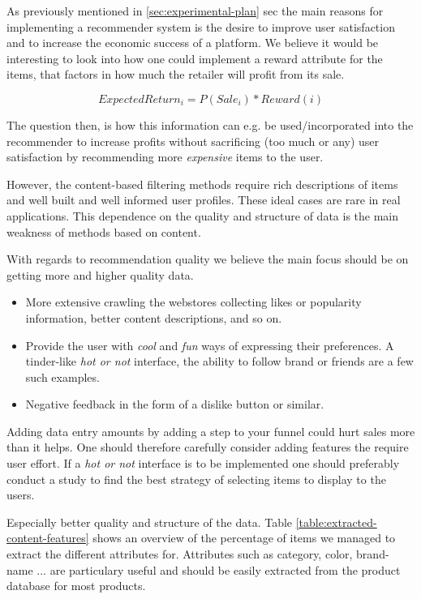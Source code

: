 As previously mentioned in \ref{sec:experimental-plan} sec the main reasons for implementing a recommender
system is the desire to improve user satisfaction and to increase the economic success of a platform.
We believe it would be interesting to look into how one could implement a reward attribute for the
items, that factors in how much the retailer will profit from its sale.

\begin{equation}
ExpectedReturn_i = P(Sale_i) * Reward(i)
\end{equation}

The question then, is how this information can e.g. be used/incorporated into the recommender to
increase profits without sacrificing (too much or any) user satisfaction by recommending
more \emph{expensive} items to the user.


However, the content-based filtering methods require rich descriptions of items and well built 
and well informed user profiles. These ideal cases are rare in real applications. This dependence 
on the quality and structure of data is the main weakness of methods based on content.


With regards to recommendation quality we believe the main focus should be on getting more
and higher quality data.

\begin{itemize}
\item More extensive crawling the webstores collecting likes or popularity information, better content descriptions,
	  and so on.	 
\item Provide the user with \emph{cool} and \emph{fun} ways of expressing their preferences. A tinder-like \emph{hot or not}
	  interface, the ability to follow brand or friends are a few such examples.
\item Negative feedback in the form of a dislike button or similar.
\end{itemize}

Adding data entry amounts by adding a step to your funnel could hurt sales more than it helps. One should
therefore carefully consider adding features the require user effort. If a \emph{hot or not} interface is to be implemented
one should preferably conduct a study to find the best strategy of selecting items to display to the users.

Especially better quality and structure of the data. Table \ref{table:extracted-content-features} shows an overview of
the percentage of items we managed to extract the different attributes for. Attributes such as category, color, brand-name ...
are particulary useful and should be easily extracted from the product database for most products. 

